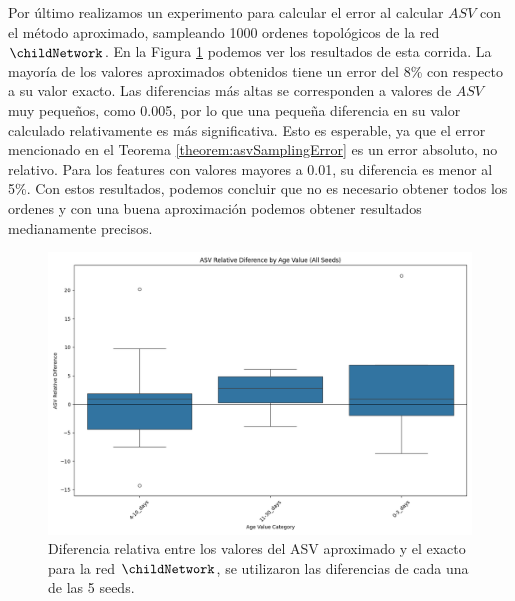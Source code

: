 Por último realizamos un experimento para calcular el error al calcular $ASV$ con el método aproximado, sampleando 1000 ordenes topológicos de la red $\childNetwork$. En la Figura \ref{fig:boxplotASVApproximateDifferences} podemos ver los resultados de esta corrida. La mayoría de los valores aproximados obtenidos tiene un error del 8\% con respecto a su valor exacto. Las diferencias más altas se corresponden a valores de $ASV$ muy pequeños, como 0.005, por lo que una pequeña diferencia en su valor calculado relativamente es más significativa. Esto es esperable, ya que el error mencionado en el Teorema \ref{theorem:asvSamplingError} es un error absoluto, no relativo. Para los features con valores mayores a 0.01, su diferencia es menor al 5\%.
Con estos resultados, podemos concluir que no es necesario obtener todos los ordenes y con una buena aproximación podemos obtener resultados medianamente precisos. 


\begin{figure}
    \centering
    \includegraphics[width=0.8\linewidth]{img/asvResults/ChildAllSeedsASVBoxplot.png}
    \caption{Diferencia relativa entre los valores del ASV aproximado y el exacto para la red $\childNetwork$, se utilizaron las diferencias de cada una de las 5 seeds.}
    \label{fig:boxplotASVApproximateDifferences}
\end{figure}


